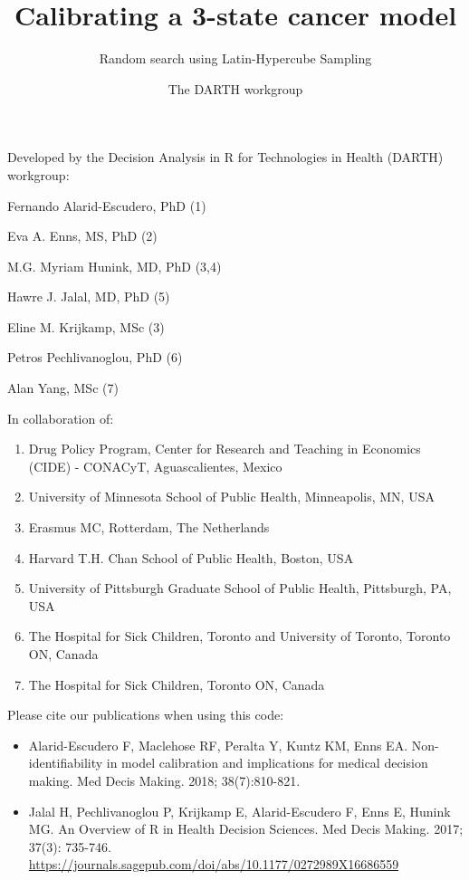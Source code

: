 \documentclass[
]{article}
\title{Calibrating a 3-state cancer model}
\subtitle{Random search using Latin-Hypercube Sampling}
\author{The DARTH workgroup}
\date{}
\providecommand{\tightlist}{%
  \setlength{\itemsep}{0pt}\setlength{\parskip}{0pt}}
\begin{document}
\maketitle

Developed by the Decision Analysis in R for Technologies in Health
(DARTH) workgroup:

Fernando Alarid-Escudero, PhD (1)

Eva A. Enns, MS, PhD (2)

M.G. Myriam Hunink, MD, PhD (3,4)

Hawre J. Jalal, MD, PhD (5)

Eline M. Krijkamp, MSc (3)

Petros Pechlivanoglou, PhD (6)

Alan Yang, MSc (7)

In collaboration of:

\begin{enumerate}
\def\labelenumi{\arabic{enumi}.}
\tightlist
\item
  Drug Policy Program, Center for Research and Teaching in Economics
  (CIDE) - CONACyT, Aguascalientes, Mexico
\item
  University of Minnesota School of Public Health, Minneapolis, MN, USA
\item
  Erasmus MC, Rotterdam, The Netherlands
\item
  Harvard T.H. Chan School of Public Health, Boston, USA
\item
  University of Pittsburgh Graduate School of Public Health, Pittsburgh,
  PA, USA
\item
  The Hospital for Sick Children, Toronto and University of Toronto,
  Toronto ON, Canada
\item
  The Hospital for Sick Children, Toronto ON, Canada
\end{enumerate}

Please cite our publications when using this code:

\begin{itemize}
\item
  Alarid-Escudero F, Maclehose RF, Peralta Y, Kuntz KM, Enns EA.
  Non-identifiability in model calibration and implications for medical
  decision making. Med Decis Making. 2018; 38(7):810-821.
\item
  Jalal H, Pechlivanoglou P, Krijkamp E, Alarid-Escudero F, Enns E,
  Hunink MG. An Overview of R in Health Decision Sciences. Med Decis
  Making. 2017; 37(3): 735-746.
  \url{https://journals.sagepub.com/doi/abs/10.1177/0272989X16686559}
\end{itemize}
\end{document}
